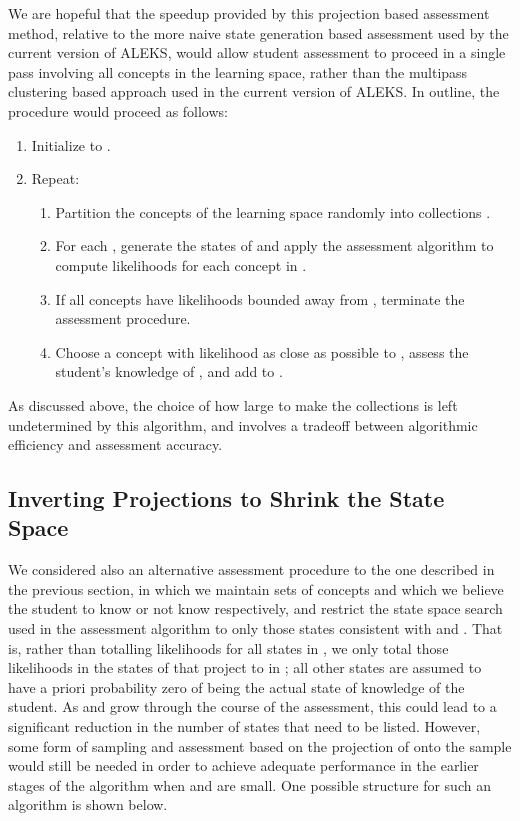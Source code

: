 \documentclass[11pt]{llncs}
\begin{document}
{We are hopeful that the speedup provided by this projection based assessment method, relative to the more naive state generation based assessment used by the current version of ALEKS, would allow student assessment to proceed in a single pass involving all concepts in the learning space, rather than the multipass clustering based approach used in the current version of ALEKS. In outline, the procedure would proceed as follows:

\begin{enumerate}
\item Initialize  to .
\item Repeat:
\begin{enumerate}
\item Partition the concepts of the learning space randomly into collections .
\item For each , generate the states of  and apply the assessment algorithm to compute likelihoods for each concept in .
\item If all concepts have likelihoods bounded away from , terminate the assessment procedure.
\item Choose a concept  with likelihood as close as possible to , assess the student's knowledge of , and add  to .
\end{enumerate}
\end{enumerate}

As discussed above, the choice of how large to make the collections  is left undetermined by this algorithm, and involves a tradeoff between algorithmic efficiency and assessment accuracy.

\subsection{Inverting Projections to Shrink the State Space}

We considered also an alternative assessment procedure to the one described in the previous section, in which we maintain sets of concepts  and  which we believe the student to know or not know respectively, and restrict the state space search used in the assessment algorithm to only those states consistent with  and . That is, rather than totalling likelihoods for all states in , we only
total those likelihoods in the states of  that project to  in ; all other states are assumed to have a priori probability zero of being the actual state of knowledge of the student. As  and  grow through the course of the assessment, this could lead to a significant reduction in the number of states that need to be listed.  However, some form of sampling and assessment based on the projection of  onto the sample would still be needed in order to achieve adequate performance in the earlier stages of the algorithm when  and  are small. One possible structure for such an algorithm is shown below.

}
\end{document}
